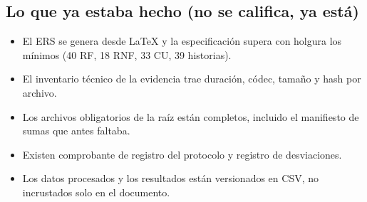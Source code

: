 \documentclass[11pt,a4paper]{article}
\begin{document}
\subsection*{Lo que ya estaba hecho (no se califica, ya está)}
\begin{itemize}
    \item El ERS se genera desde \LaTeX{} y la especificación supera con holgura los mínimos (40 RF, 18 RNF, 33 CU, 39 historias).
    \item El inventario técnico de la evidencia trae duración, códec, tamaño y hash por archivo.
    \item Los archivos obligatorios de la raíz están completos, incluido el manifiesto de sumas que antes faltaba.
    \item Existen comprobante de registro del protocolo y registro de desviaciones.
    \item Los datos procesados y los resultados están versionados en CSV, no incrustados solo en el documento.
\end{itemize}
\end{document}
